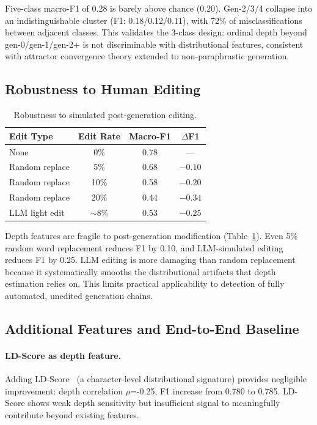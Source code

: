 \documentclass[11pt]{article}
\begin{document}
Five-class macro-F1 of 0.28 is barely above chance (0.20).
Gen-2/3/4 collapse into an indistinguishable cluster (F1: 0.18/0.12/0.11), with 72\% of misclassifications between adjacent classes.
This validates the 3-class design: ordinal depth beyond gen-0/gen-1/gen-2+ is not discriminable with distributional features, consistent with attractor convergence theory extended to non-paraphrastic generation.

\subsection{Robustness to Human Editing}
\label{sec:robustness}

\begin{table}[h]
\centering
\caption{Robustness to simulated post-generation editing.}
\label{tab:edits}
\begin{tabular}{lccc}
\toprule
Edit Type & Edit Rate & Macro-F1 & $\Delta$F1 \\
\midrule
None & 0\% & 0.78 & --- \\
Random replace & 5\% & 0.68 & $-0.10$ \\
Random replace & 10\% & 0.58 & $-0.20$ \\
Random replace & 20\% & 0.44 & $-0.34$ \\
LLM light edit & $\sim$8\% & 0.53 & $-0.25$ \\
\bottomrule
\end{tabular}
\end{table}

Depth features are fragile to post-generation modification (Table~\ref{tab:edits}).
Even 5\% random word replacement reduces F1 by 0.10, and LLM-simulated editing reduces F1 by 0.25.
LLM editing is more damaging than random replacement because it systematically smooths the distributional artifacts that depth estimation relies on.
This limits practical applicability to detection of fully automated, unedited generation chains.

\subsection{Additional Features and End-to-End Baseline}
\label{sec:e2e}

\paragraph{LD-Score as depth feature.}
Adding LD-Score~\citep{tulchinskii2024ldscore} (a character-level distributional signature) provides negligible improvement: depth correlation $\rho$=-0.25, F1 increase from 0.780 to 0.785.
LD-Score shows weak depth sensitivity but insufficient signal to meaningfully contribute beyond existing features.
\end{document}
